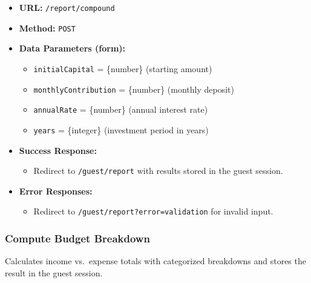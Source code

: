 \begin{itemize}
    \item \textbf{URL:} \texttt{/report/compound}
    \item \textbf{Method:} \texttt{POST}
    \item \textbf{Data Parameters (form):}
    \begin{itemize}
        \item \texttt{initialCapital} = \{number\} (starting amount)
        \item \texttt{monthlyContribution} = \{number\} (monthly deposit)
        \item \texttt{annualRate} = \{number\} (annual interest rate)
        \item \texttt{years} = \{integer\} (investment period in years)
    \end{itemize}
    \item \textbf{Success Response:}
    \begin{itemize}
        \item Redirect to \texttt{/guest/report} with results stored in the guest session.
    \end{itemize}
    \item \textbf{Error Responses:}
    \begin{itemize}
        \item Redirect to \texttt{/guest/report?error=validation} for invalid input.
    \end{itemize}
\end{itemize}

\subsubsection{Compute Budget Breakdown}

Calculates income vs.\ expense totals with categorized breakdowns and stores the result in the guest session.


